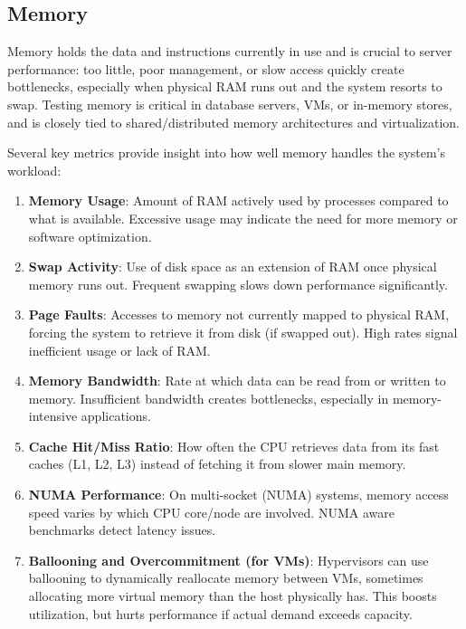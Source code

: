 \subsection{Memory} \label{subsec:memory_testing}

Memory holds the data and instructions currently in use and is crucial to server performance: too little, poor management, or slow access quickly create bottlenecks, especially when physical RAM runs out and the system resorts to swap. Testing memory is critical in database servers, VMs, or in-memory stores, and is closely tied to shared/distributed memory architectures and virtualization.

Several key metrics provide insight into how well memory handles the system's workload:

\begin{enumerate}[leftmargin=1.4em]
    \item \textbf{Memory Usage}: Amount of RAM actively used by processes compared to what is available. Excessive usage may indicate the need for more memory or software optimization.
    \item \textbf{Swap Activity}: Use of disk space as an extension of RAM once physical memory runs out. Frequent swapping slows down performance significantly.
    \item \textbf{Page Faults}: Accesses to memory not currently mapped to physical RAM, forcing the system to retrieve it from disk (if swapped out). High rates signal inefficient usage or lack of RAM.
    \item \textbf{Memory Bandwidth}: Rate at which data can be read from or written to memory. Insufficient bandwidth creates bottlenecks, especially in memory-intensive applications.
    \item \textbf{Cache Hit/Miss Ratio}: How often the CPU retrieves data from its fast caches (L1, L2, L3) instead of fetching it from slower main memory.
    \item \textbf{NUMA Performance}: On multi-socket (NUMA) systems, memory access speed varies by which CPU core/node are involved. NUMA aware benchmarks detect latency issues.
    \item \textbf{Ballooning and Overcommitment (for VMs)}: Hypervisors can use ballooning to dynamically reallocate memory between VMs, sometimes allocating more virtual memory than the host physically has. This boosts utilization, but hurts performance if actual demand exceeds capacity.
\end{enumerate}

